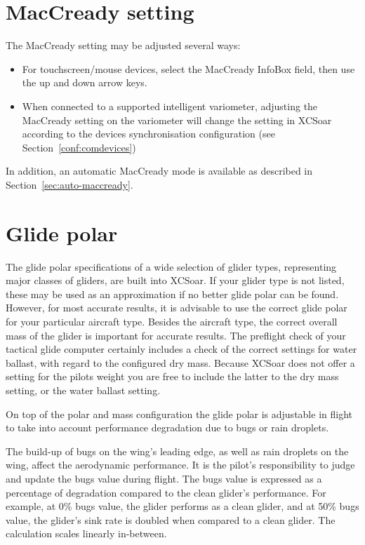 \section{MacCready setting}

The MacCready setting may be adjusted several ways:
\begin{itemize}
\item For touchscreen/mouse devices, select the MacCready InfoBox field, then
  use the up and down arrow keys.
\item When connected to a supported intelligent variometer, adjusting
  the MacCready setting on the variometer will change the setting
  in XCSoar according to the devices synchronisation configuration (see 
  Section~\ref{conf:comdevices})
\end{itemize}
In addition, an automatic MacCready mode is available as described in
Section~\ref{sec:auto-maccready}.


\section{Glide polar}\label{sec:glidepolar}

The glide polar specifications of a wide selection of glider types,
representing major classes of gliders, are built into XCSoar.
If your glider type is not listed, these may be used as an approximation
if no better glide polar can be found.   However, for most 
accurate results, it is advisable to use the correct glide polar for your particular
aircraft type. 
Besides the aircraft type, the correct overall mass of the glider is important for
accurate results. 
The preflight check of your tactical glide computer certainly 
includes a check of the correct settings for water ballast, with regard to the 
configured dry mass. Because XCSoar does not offer a setting for the pilots 
weight you are free to include the latter to the dry mass setting, or the 
water ballast setting.

On top of the polar and mass configuration the glide polar is adjustable 
in flight to take into account performance degradation due to bugs or 
rain droplets.

The build-up of bugs on the wing's leading edge, as well as rain
droplets on the wing, affect the aerodynamic performance.  It is the
pilot's responsibility to judge and update the bugs value during
flight.  The bugs value is expressed as a percentage of degradation 
compared to the clean glider's performance.
For example, at 0\% bugs value, the glider
performs as a clean glider, and at 50\% bugs value, the glider's
sink rate is doubled when compared to a clean glider. The calculation 
scales linearly in-between. 

